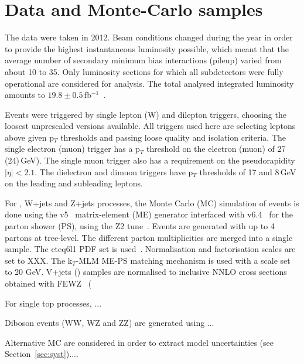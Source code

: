 \section{Data and Monte-Carlo samples}
\label{sec:samples}

The data were taken in 2012. Beam conditions changed during the year
in order to provide the highest instantaneous luminosity possible,
which meant that the average number of secondary minimum bias
interactions (pileup) varied from about 10 to 35. Only luminosity
sections for which all subdetectors were fully operational are
considered for analysis. The total analysed integrated luminosity
amounts to $19.8 \pm 0.5$\,fb$^{-1}$~\cite{CMS-PAS-LUM-13-001}.

Events were triggered by single lepton (W) and dilepton triggers,
choosing the loosest unprescaled versions available. All triggers used
here are selecting leptons above given p$_T$ thresholds and passing
loose quality and isolation criteria. The single electron (muon)
trigger has a p$_T$ threshold on the electron (muon) of 27
(24)\,GeV). The single muon trigger also has a requirement on the
pseudorapidity $|\eta|<2.1$. The dielectron and dimuon triggers have
p$_T$ thresholds of 17 and 8\,GeV on the leading and subleading
leptons.

For \ttbar, W+jets and Z+jets processes, the Monte Carlo (MC)
simulation of events is done using the \madgraph
v5~\cite{Alwall:2011uj} matrix-element (ME) generator interfaced with
\pythia v6.4~\cite{Sjostrand:2006za} for the parton shower (PS), using
the Z2 tune~\cite{Khachatryan:2010nk}. Events are generated with up to
4 partons at tree-level. The different parton multiplicities are
merged into a single sample. The cteq6l1 PDF set is
used~\cite{Pumplin:2002vw}. Normalisation and factorisation scales are
set to XXX. The k$_T$-MLM ME-PS matching mechanism is used with a
scale set to 20 GeV. V+jets (\ttbar) samples are normalised to
inclusive NNLO cross sections obtained with FEWZ~\cite{Gavin:2010az} (

For single top processes, ...

Diboson events (WW, WZ and ZZ) are generated using ...

Alternative MC are considered in order to extract model uncertainties
(see Section~\ref{sec:syst})....
